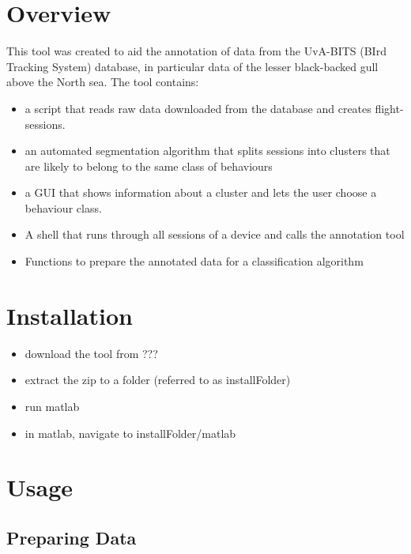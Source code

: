 \documentclass[a4paper, 11pt]{article}
\begin{document}

\vspace*{00mm}
\tableofcontents
\newpage

\section{Overview}

This tool was created to aid the annotation of data from the UvA-BITS (BIrd Tracking System) database, in particular data of the lesser black-backed gull above the North sea. The tool contains:
\begin{itemize}
\item
a script that reads raw data downloaded from the database and creates flight-sessions.
\item
an automated segmentation algorithm that splits sessions into clusters that are likely to belong to the same class of behaviours 
\item
a GUI that shows information about a cluster and lets the user choose a behaviour class.
\item
A shell that runs through all sessions of a device and calls the annotation tool
\item
Functions to prepare the annotated data for a classification algorithm
\end{itemize}

\section{Installation}
\begin{itemize}
	\item
	download the tool from ???
	\item
	extract the zip to a folder (referred to as installFolder)
	\item
	run matlab
	\item
	in matlab, navigate to installFolder/matlab
\end{itemize}
\section{Usage}
\subsection{Preparing Data}
 
\end{document}
